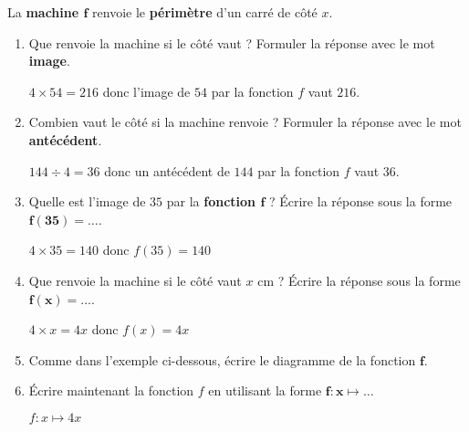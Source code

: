 \begin{corrige}
    La \textbf{machine $\boldsymbol{f}$} renvoie le \textbf{périmètre} d'un carré de côté $x$.
    
    \hspace*{-13mm}

    
  \begin{enumerate}
    \item Que renvoie la machine si le côté vaut   ? Formuler la réponse avec le mot \textbf{image}.
    
    {\red $4\times 54 = 216$ donc l'image de $54$ par la fonction $f$ vaut $216$.}
    \item Combien vaut le côté si la machine renvoie   ? Formuler la réponse avec le mot \textbf{antécédent}.
    
    {\red $144\div 4 = 36$ donc un antécédent de $144$ par la fonction $f$ vaut $36$.}
    \item Quelle est l'image de $35$ par la \textbf{fonction $\boldsymbol{f}$ } ? Écrire la réponse sous la forme $\boldsymbol{f(35)=\ldots}$.
    
    {\red $4\times 35 = 140$ donc $f(35)=140$}
    \item Que renvoie la machine si le côté vaut $x$ cm ? Écrire la réponse sous la forme $\boldsymbol{f(x)=\ldots}$.
    
    {\red $4\times x = 4x$ donc $f(x)=4x$}
    \item Comme dans l'exemple ci-dessous, écrire le diagramme de la fonction $\boldsymbol{f}$.

    \medskip
\medskip
    \item Écrire maintenant la fonction $f$ en utilisant la forme $\boldsymbol{f:x} \longmapsto \ldots$
    
    {\red $f:x \longmapsto 4x$}
\end{enumerate}
\end{corrige}
